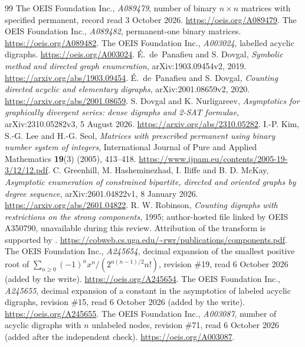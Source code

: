 \documentclass[11pt]{article}
\theoremstyle{definition}\newtheorem{definition}[theorem]{Definition}
\theoremstyle{remark}\newtheorem{remark}[theorem]{Remark}
\begin{document}
\begin{thebibliography}{99}
 The OEIS Foundation Inc., \emph{A089479}, number of binary $n\times n$ matrices with specified permanent, record read 3 October 2026. \url{https://oeis.org/A089479}.
 The OEIS Foundation Inc., \emph{A089482}, permanent-one binary matrices. \url{https://oeis.org/A089482}.
 The OEIS Foundation Inc., \emph{A003024}, labelled acyclic digraphs. \url{https://oeis.org/A003024}.
 \mbox{\'E. de Panafieu} and S. Dovgal, \emph{Symbolic method and directed graph enumeration}, arXiv:1903.09454v2, 2019. \url{https://arxiv.org/abs/1903.09454}.
 \mbox{\'E. de Panafieu} and S. Dovgal, \emph{Counting directed acyclic and elementary digraphs}, arXiv:2001.08659v2, 2020. \url{https://arxiv.org/abs/2001.08659}.
 S. Dovgal and K. Nurligareev, \emph{Asymptotics for graphically divergent series: dense digraphs and 2-SAT formulae}, arXiv:2310.05282v3, 5 August 2026. \url{https://arxiv.org/abs/2310.05282}.
 I.-P. Kim, S.-G. Lee and H.-G. Seol, \emph{Matrices with prescribed permanent using binary number system of integers}, International Journal of Pure and Applied Mathematics \textbf{19}(3) (2005), 413--418. \url{https://www.ijpam.eu/contents/2005-19-3/12/12.pdf}.
 C. Greenhill, M. Hasheminezhad, I. Iliffe and B. D. McKay, \emph{Asymptotic enumeration of constrained bipartite, directed and oriented graphs by degree sequence}, arXiv:2601.04822v1, 8 January 2026. \url{https://arxiv.org/abs/2601.04822}.
 R. W. Robinson, \emph{Counting digraphs with restrictions on the strong components}, 1995; author-hosted file linked by OEIS A350790, unavailable during this review. Attribution of the transform is supported by \cite{symbolic}. \url{https://cobweb.cs.uga.edu/~rwr/publications/components.pdf}.
 The OEIS Foundation Inc., \emph{A245654}, decimal expansion of the smallest positive root of $\sum_{n\ge0}(-1)^nx^n/(2^{n(n-1)/2}n!)$, revision \#19, read 6 October 2026 (added by the write). \url{https://oeis.org/A245654}.
 The OEIS Foundation Inc., \emph{A245655}, decimal expansion of a constant in the asymptotics of labeled acyclic digraphs, revision \#15, read 6 October 2026 (added by the write). \url{https://oeis.org/A245655}.
 The OEIS Foundation Inc., \emph{A003087}, number of acyclic digraphs with $n$ unlabeled nodes, revision \#71, read 6 October 2026 (added after the independent check). \url{https://oeis.org/A003087}.
\end{thebibliography}
\end{document}
